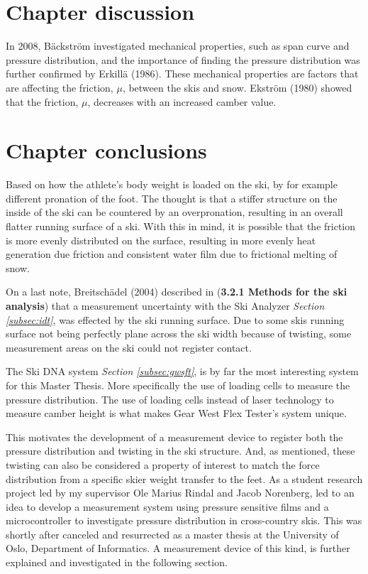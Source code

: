 \section{Chapter discussion}
In 2008, Bäckström investigated mechanical properties, such as span curve and pressure distribution, and the importance of finding the pressure distribution was further confirmed by Erkillä (1986). These mechanical properties are factors that are affecting the friction, $\mu$, between the skis and snow. Ekström (1980) showed that the friction, $\mu$, decreases with an increased camber value.


\section{Chapter conclusions}
\label{sec:backgroundconclusion}
Based on how the athlete's body weight is loaded on the ski, by for example different pronation of the foot. The thought is that a stiffer structure on the inside of the ski can be countered by an overpronation, resulting in an overall flatter running surface of a ski. With this in mind, it is possible that the friction is more evenly distributed on the surface, resulting in more evenly heat generation due friction and consistent water film due to frictional melting of snow.

On a last note, Breitschädel (2004) described in (\textbf{3.2.1 Methods for the ski analysis}) that a measurement uncertainty  with the Ski Analyzer \textit{Section \ref{subsec:idt}}, was effected by the ski running surface. Due to some skis running surface not being perfectly plane across the ski width because of twisting, some measurement areas on the ski could not register contact.

The Ski DNA system \textit{Section \ref{subsec:gwsft}}, is by far the most interesting system for this Master Thesis. More specifically the use of loading cells to measure the pressure distribution. The use of loading cells instead of laser technology to measure camber height is what makes Gear West Flex Tester's system unique.

This motivates the development of a measurement device to register both the pressure distribution and twisting in the ski structure. And, as mentioned, these twisting can also be considered a property of interest to match the force distribution from a specific skier weight transfer to the feet. As a student research project led by my supervisor Ole Marius Rindal and Jacob Norenberg, led to an idea to develop a measurement system using pressure sensitive films and a microcontroller to investigate pressure distribution in cross-country skis. This was shortly after canceled and resurrected as a master thesis at the University of Oslo, Department of Informatics.
A measurement device of this kind, is further explained and investigated in the following section.